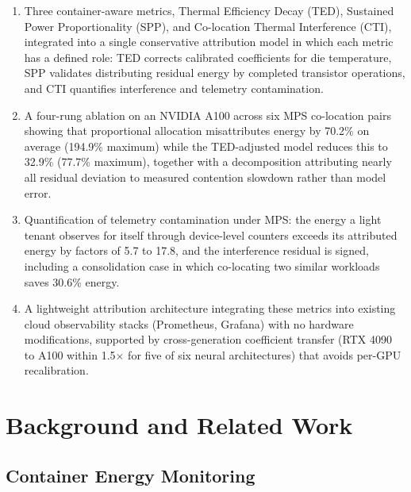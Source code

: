\documentclass[conference]{IEEEtran}
\begin{document}
\begin{enumerate}
    \item Three container-aware metrics, Thermal Efficiency Decay (TED), Sustained Power Proportionality (SPP), and Co-location Thermal Interference (CTI), integrated into a single conservative attribution model in which each metric has a defined role: TED corrects calibrated coefficients for die temperature, SPP validates distributing residual energy by completed transistor operations, and CTI quantifies interference and telemetry contamination.

    \item A four-rung ablation on an NVIDIA A100 across six MPS co-location pairs showing that proportional allocation misattributes energy by 70.2\% on average (194.9\% maximum) while the TED-adjusted model reduces this to 32.9\% (77.7\% maximum), together with a decomposition attributing nearly all residual deviation to measured contention slowdown rather than model error.

    \item Quantification of telemetry contamination under MPS: the energy a light tenant observes for itself through device-level counters exceeds its attributed energy by factors of 5.7 to 17.8, and the interference residual is signed, including a consolidation case in which co-locating two similar workloads saves 30.6\% energy.

    \item A lightweight attribution architecture integrating these metrics into existing cloud observability stacks (Prometheus, Grafana) with no hardware modifications, supported by cross-generation coefficient transfer (RTX 4090 to A100 within 1.5$\times$ for five of six neural architectures) that avoids per-GPU recalibration.
\end{enumerate}


\section{Background and Related Work}
\label{sec:related}

\subsection{Container Energy Monitoring}
\end{document}
